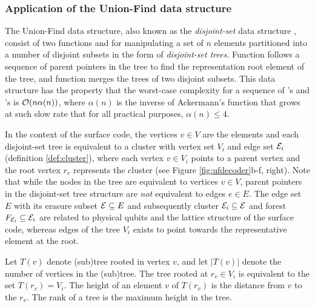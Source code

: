 \subsubsection{Application of the Union-Find data structure}
The Union-Find data structure, also known as the \emph{disjoint-set} data structure \cite{tarjan1975efficiency}, consist of two functions  and  for manipulating a set of $n$ elements partitioned into a number of disjoint subsets in the form of \emph{disjoint-set trees}. Function  follows a sequence of parent pointers in the tree to find the representation root element of the tree, and function  merges the trees of two disjoint subsets. This data structure has the property that the worst-case complexity for a sequence of 's and 's is $\mathcal{O}(n\alpha(n))$, where $\alpha(n)$ is the inverse of Ackermann's function that grows at such slow rate that for all practical purposes, $\alpha(n)\leq 4$. 

In the context of the surface code, the vertices $v\in V$ are the elements and each disjoint-set tree is equivalent to a cluster with vertex set $V_i$ and edge set $\mathcal{E}_i$ (definition \ref{def:cluster}), where each vertex $v\in V_i$ points to a parent vertex and the root vertex $r_v$ represents the cluster (see Figure \ref{fig:ufdecoder}b-f, right). Note that while the nodes in the tree are equivalent to vertices $v \in V$, parent pointers in the disjoint-set tree structure are \emph{not} equivalent to edges $e\in E$. The edge set $E$ with its erasure subset $\mathcal{E}\subseteq E$ and subsequently cluster $\mathcal{E}_i\subseteq \mathcal{E}$ and forest $F_{\mathcal{E}_i}\subseteq \mathcal{E}_i$ are related to physical qubits and the lattice structure of the surface code, whereas edges of the tree $V_i$ exists to point towards the representative element at the root.
\begin{definition}\label{def:trees}
  Let $T(v)$ denote (sub)tree rooted in vertex $v$, and let $|T(v)|$ denote the number of vertices in the (sub)tree. The tree rooted at $r_v\in V_i$ is equivalent to the set $T(r_v)=V_i$. The height of an element $v$ of $T(r_v)$ is the distance from $v$ to the $r_v$. The rank of a tree is the maximum height in the tree. 
\end{definition}

